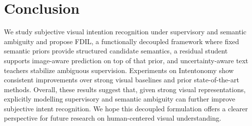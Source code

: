 \section{Conclusion}
\label{sec:conclusion}

We study subjective visual intention recognition under supervisory and semantic ambiguity and propose FDIL, a functionally decoupled framework where fixed semantic priors provide structured candidate semantics, a residual student supports image-aware prediction on top of that prior, and uncertainty-aware text teachers stabilize ambiguous supervision. Experiments on Intentonomy show consistent improvements over strong visual baselines and prior state-of-the-art methods.  Overall, these results suggest that, given strong visual representations, explicitly modelling supervisory and semantic ambiguity can further improve subjective intent recognition. We hope this decoupled formulation offers a clearer perspective for future research on human-centered visual understanding.
